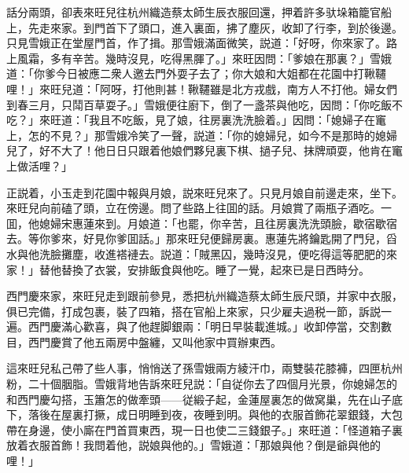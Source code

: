 話分兩頭，卻表來旺兒往杭州織造蔡太師生辰衣服回還，押着許多驮垛箱籠官船上，先走來家。到門首下了頭口，進入裏面，拂了塵灰，收卸了行李，到於後邊。只見雪娥正在堂屋門首，作了揖。那雪娥滿面微笑，説道：「好呀，你來家了。路上風霜，多有辛苦。幾時沒見，吃得黑腪了。」來旺因問：「爹娘在那裏？」雪娥道：「你爹今日被應二衆人邀去門外耍子去了；你大娘和大姐都在花園中打鞦韆哩！」來旺兒道：「阿呀，打他則甚！鞦韆雖是北方戎戲，南方人不打他。婦女們到春三月，只鬦百草耍子。」雪娥便往廚下，倒了一盞茶與他吃，因問：「你吃飯不吃？」來旺道：「我且不吃飯，見了娘，往房裏洗洗臉着。」因問：「媳婦子在竃上，怎的不見？」那雪娥冷笑了一聲，説道：「你的媳婦兒，如今不是那時的媳婦兒了，好不大了！他日日只跟着他娘們夥兒裏下棋、撾子兒、抹牌頑耍，他肯在竃上做活哩？」

正説着，小玉走到花園中報與月娘，説來旺兒來了。只見月娘自前邊走來，坐下。來旺兒向前磕了頭，立在傍邊。問了些路上往囬的話。月娘賞了兩瓶子酒吃。一囬，他媳婦宋惠蓮來到。月娘道：「也罷，你辛苦，且往房裏洗洗頭臉，歇宿歇宿去。等你爹來，好見你爹囬話。」那來旺兒便歸房裏。惠蓮先將鑰匙開了門兒，舀水與他洗臉攤塵，收進褡褳去。説道：「賊黑囚，幾時沒見，便吃得這等肥肥的來家！」替他替換了衣裳，安排飯食與他吃。睡了一覺，起來已是日西時分。

西門慶來家，來旺兒走到跟前參見，悉把杭州織造蔡太師生辰尺頭，并家中衣服，俱已完備，打成包裹，裝了四箱，搭在官船上來家，只少雇夫過税一節，訴説一遍。西門慶滿心歡喜，與了他趕脚銀兩：「明日早裝載進城。」收卸停當，交割數目，西門慶賞了他五兩房中盤纏，又叫他家中買辦東西。

這來旺兒私己帶了些人事，悄悄送了孫雪娥兩方綾汗巾，兩雙裝花膝褲，四匣杭州粉，二十個胭脂。雪娥背地告訴來旺兒説：「自従你去了四個月光景，你媳婦怎的和西門慶勾搭，玉簫怎的做牽頭——従緞子起，金蓮屋裏怎的做窝巢，先在山子底下，落後在屋裏打撅，成日明睡到夜，夜睡到明。與他的衣服首飾花翠銀錢，大包帶在身邊，使小廝在門首買東西，現一日也使二三錢銀子。」來旺道：「怪道箱子裏放着衣服首飾！我問着他，説娘與他的。」雪娥道：「那娘與他？倒是爺與他的哩！」

